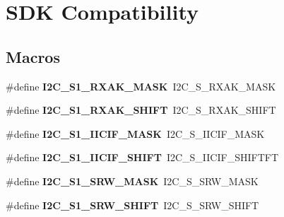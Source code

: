 \hypertarget{group___s_d_k___compatibility___symbols}{}\section{S\+DK Compatibility}
\label{group___s_d_k___compatibility___symbols}
\subsection*{Macros}
\begin{DoxyCompactItemize}
\item 
\mbox{\label{group___s_d_k___compatibility___symbols_ga6de7c5bc33b49184c31fb4976dd02307}} 
\#define {\bfseries I2\+C\+\_\+\+S1\+\_\+\+R\+X\+A\+K\+\_\+\+M\+A\+SK}~I2\+C\+\_\+\+S\+\_\+\+R\+X\+A\+K\+\_\+\+M\+A\+SK
\item 
\mbox{\label{group___s_d_k___compatibility___symbols_gaf831d3419446c87e5f25555ff59ffcbb}} 
\#define {\bfseries I2\+C\+\_\+\+S1\+\_\+\+R\+X\+A\+K\+\_\+\+S\+H\+I\+FT}~I2\+C\+\_\+\+S\+\_\+\+R\+X\+A\+K\+\_\+\+S\+H\+I\+FT
\item 
\mbox{\label{group___s_d_k___compatibility___symbols_ga989c54e1ec70d4e2390d5f3905b48f2b}} 
\#define {\bfseries I2\+C\+\_\+\+S1\+\_\+\+I\+I\+C\+I\+F\+\_\+\+M\+A\+SK}~I2\+C\+\_\+\+S\+\_\+\+I\+I\+C\+I\+F\+\_\+\+M\+A\+SK
\item 
\mbox{\label{group___s_d_k___compatibility___symbols_ga52bcd20e5c1da79164fadb85347712b6}} 
\#define {\bfseries I2\+C\+\_\+\+S1\+\_\+\+I\+I\+C\+I\+F\+\_\+\+S\+H\+I\+FT}~I2\+C\+\_\+\+S\+\_\+\+I\+I\+C\+I\+F\+\_\+\+S\+H\+I\+F\+T\+FT
\item 
\mbox{\label{group___s_d_k___compatibility___symbols_ga4ad4bf6aa42858bb4d99146dd1a77b62}} 
\#define {\bfseries I2\+C\+\_\+\+S1\+\_\+\+S\+R\+W\+\_\+\+M\+A\+SK}~I2\+C\+\_\+\+S\+\_\+\+S\+R\+W\+\_\+\+M\+A\+SK
\item 
\mbox{\label{group___s_d_k___compatibility___symbols_gae2e8f0f444058e01ba2b8ebf3da6dabe}} 
\#define {\bfseries I2\+C\+\_\+\+S1\+\_\+\+S\+R\+W\+\_\+\+S\+H\+I\+FT}~I2\+C\+\_\+\+S\+\_\+\+S\+R\+W\+\_\+\+S\+H\+I\+FT

\end{DoxyCompactItemize}
